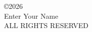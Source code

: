 \vspace{11pt}
\begin{center}
\begin{singlespace}
\copyright 2026\\
Enter Your Name\\
ALL RIGHTS RESERVED
\end{singlespace}
\end{center}

\clearpage
